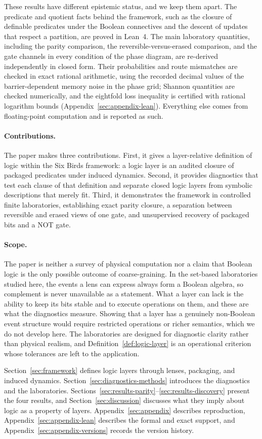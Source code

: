 These results have different epistemic status, and we keep them apart. The predicate and quotient facts behind the framework, such as the closure of definable predicates under the Boolean connectives and the descent of updates that respect a partition, are proved in Lean~4. The main laboratory quantities, including the parity comparison, the reversible-versus-erased comparison, and the gate channels in every condition of the phase diagram, are re-derived independently in closed form. Their probabilities and route mismatches are checked in exact rational arithmetic, using the recorded decimal values of the barrier-dependent memory noise in the phase grid; Shannon quantities are checked numerically, and the eightfold loss inequality is certified with rational logarithm bounds (Appendix~\ref{sec:appendix-lean}). Everything else comes from floating-point computation and is reported as such.

\paragraph{Contributions.}
The paper makes three contributions. First, it gives a layer-relative definition of logic within the Six Birds framework: a logic layer is an audited closure of packaged predicates under induced dynamics. Second, it provides diagnostics that test each clause of that definition and separate closed logic layers from symbolic descriptions that merely fit. Third, it demonstrates the framework in controlled finite laboratories, establishing exact parity closure, a separation between reversible and erased views of one gate, and unsupervised recovery of packaged bits and a NOT gate.

\paragraph{Scope.}
The paper is neither a survey of physical computation nor a claim that Boolean logic is the only possible outcome of coarse-graining. In the set-based laboratories studied here, the events a lens can express always form a Boolean algebra, so complement is never unavailable as a statement. What a layer can lack is the ability to keep its bits stable and to execute operations on them, and these are what the diagnostics measure. Showing that a layer has a genuinely non-Boolean event structure would require restricted operations or richer semantics, which we do not develop here. The laboratories are designed for diagnostic clarity rather than physical realism, and Definition~\ref{def:logic-layer} is an operational criterion whose tolerances are left to the application.

Section~\ref{sec:framework} defines logic layers through lenses, packaging, and induced dynamics. Section~\ref{sec:diagnostics-methods} introduces the diagnostics and the laboratories. Sections~\ref{sec:results-parity}--\ref{sec:results-discovery} present the four results, and Section~\ref{sec:discussion} discusses what they imply about logic as a property of layers. Appendix~\ref{sec:appendix} describes reproduction, Appendix~\ref{sec:appendix-lean} describes the formal and exact support, and Appendix~\ref{sec:appendix-versions} records the version history.
